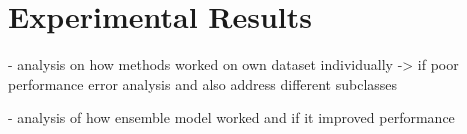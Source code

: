 \chapter{Experimental Results}
\label{chap:experiments}



- analysis on how methods worked on own dataset individually
-> if poor performance error analysis and also address different subclasses

- analysis of how ensemble model worked and if it improved performance